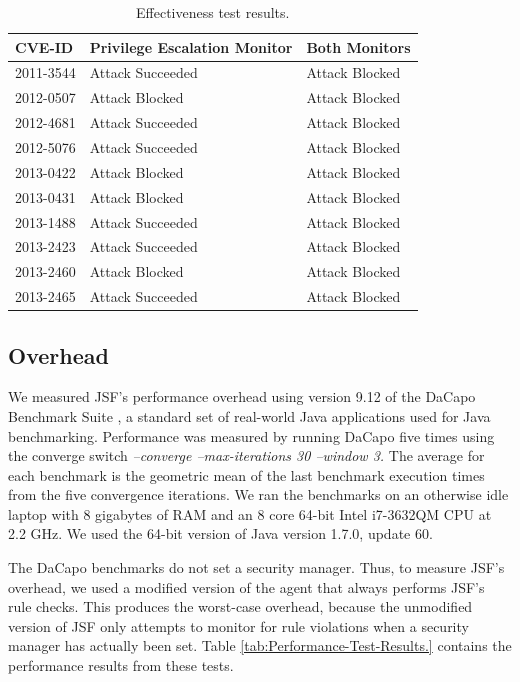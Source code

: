 \documentclass{sig-alternate}
\begin{document}
\begin{table}
\protect\caption{Effectiveness test results.}\label{tab:Exploit-experiment-summary}


\centering{}%
\begin{tabular}{l>{\raggedright}p{3cm}l}
\toprule 
\textbf{CVE-ID} & \textbf{Privilege Escalation Monitor} & \textbf{Both Monitors}\tabularnewline
\midrule
2011-3544 & Attack Succeeded  & Attack Blocked\tabularnewline
2012-0507 & Attack Blocked & Attack Blocked\tabularnewline
2012-4681 & Attack Succeeded  & Attack Blocked\tabularnewline
2012-5076 & Attack Succeeded  & Attack Blocked\tabularnewline
2013-0422 & Attack Blocked & Attack Blocked\tabularnewline
2013-0431 & Attack Blocked & Attack Blocked\tabularnewline
2013-1488 & Attack Succeeded  & Attack Blocked\tabularnewline
2013-2423 & Attack Succeeded  & Attack Blocked\tabularnewline
2013-2460 & Attack Blocked & Attack Blocked\tabularnewline
2013-2465 & Attack Succeeded  & Attack Blocked\tabularnewline
\bottomrule
\end{tabular}
\end{table}



\subsection{Overhead}\label{sub:Overhead}

We measured JSF's performance overhead using version 9.12 of the DaCapo
Benchmark Suite \cite{DaCapo:paper}, a standard set of real-world
Java applications used for Java benchmarking. Performance was measured
by running DaCapo five times using the converge switch \emph{--converge
--max-iterations 30 --window 3. }The average for each benchmark is
the geometric mean of the last benchmark execution times from the
five convergence iterations. We ran the benchmarks on an otherwise
idle laptop with 8 gigabytes of RAM and an 8 core 64-bit Intel i7-3632QM
CPU at 2.2 GHz. We used the 64-bit version of Java version 1.7.0,
update 60.

The DaCapo benchmarks do not set a security manager. Thus, to measure
JSF's overhead, we used a modified version of the agent that always
performs JSF's rule checks. This produces the worst-case overhead,
because the unmodified version of JSF only attempts to monitor for
rule violations when a security manager has actually been set. Table
\ref{tab:Performance-Test-Results.} contains the performance results
from these tests.
\end{document}
